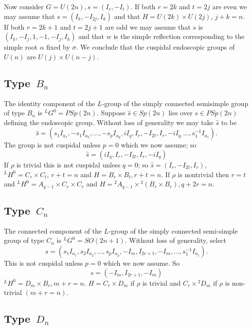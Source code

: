 \documentclass{memo-l}
\theoremstyle{definition}
\theoremstyle{remark}
\numberwithin{section}{chapter}
\numberwithin{equation}{chapter}
\begin{document}
   Now consider $G = U(2n), s = (I_{r},-I_{t})$.  If both $r = 2k$ and $t = 2j$ are
even we may assume that $s = (I_{k},-I_{2j},I_{k})$ and that $H = U(2k)\times U(2j)$,
 $j+k = n$.  If both $r = 2k+1$ and $t = 2j+1$ are odd we may assume that $s$ is
$(I_{k},-I_{j},1,-1,-I_{j},I_{k})$ and that $w$ is the simple reflection
corresponding to the simple root ${\alpha}$ fixed by ${\sigma}$.  We
conclude that the cuspidal endoscopic groups of $U(n)$ are $U(j)\times
U(n-j)$.


\subsection{Type\ $B_n$}


   The identity component of the $L$-group of the simply connected
semisimple group of type $B_{n}$ is ${}^{L}G^{0}  =  PSp(2n)$.  Suppose  $\hat s
 \in  Sp(2n)$ lies over $s  \in  PSp(2n)$ defining the endoscopic group.
Without loss of generality we may take $\hat s $ to be 
$$
\hat s = (s_{1}I_{a_1} ,-s_{1}I_{a_{2}},\ldots,-s_{p}I_{a_p}, 
iI_{q},I_{r},-I_{2t},I_{r},-iI_{q,}\ldots ,s_{1}^{-1}I_{a_1} ).
$$
The group is not cuspidal unless $p = 0$ which we now assume; so $$\hat s  = 
(iI_{q},I_{r},-I_{2t},I_{r},-iI_{q})$$  If ${\rho }$ is trivial this is not
cuspidal unless $q = 0$; so $\hat s  = (I_{r},-I_{2t},I_{r})$,\ \  ${}^{L}H^{0}  = 
C_{r}\times C_{t}$, $r+t = n$ and $H = B_{r}\times B_{t}, r+t = n$.  
If ${\rho }$ is nontrivial then $r = t$ and ${}^{L}H^{0}  =  
A_{q-1}\times C_{r}\times C_{r}$ and $H  =  {}^{2}A_{q-1}
\times {}^{2}(B_{r}\times B_{r}), q+2r = n$.

\subsection{Type\ $C_n$}

The connected component of the $L$-group of
the simply connected semi-simple group of type $C_{n}$ is ${}^{L}G^{0}  = 
SO(2n+1)$.  Without loss of generality, select 
$$
s = (s_{1}I_{a_{1}}, s_{2}I_{a_2} ,\ldots
,s_{p}I_{a_p},-I_{m},I_{2r+1},-I_{m},\ldots ,s_{1}^{-1}I_{a_1}).
$$
This is not cuspidal unless $p = 0$ which we now assume.  So
$$s = (-I_{m},I_{2r+1},-I_{m})$$  ${}^{L}H^{0} = D_{m}\times B_{r}, m+r = n$.
$H = C_{r}\times D_{m}$ if ${\rho }$ is trivial and $C_{r}\times {}^{2}D_{m}$ if ${\rho }$
is non-trivial $(m+r = n)$.

\subsection{Type\ $D_n$}
\end{document}

